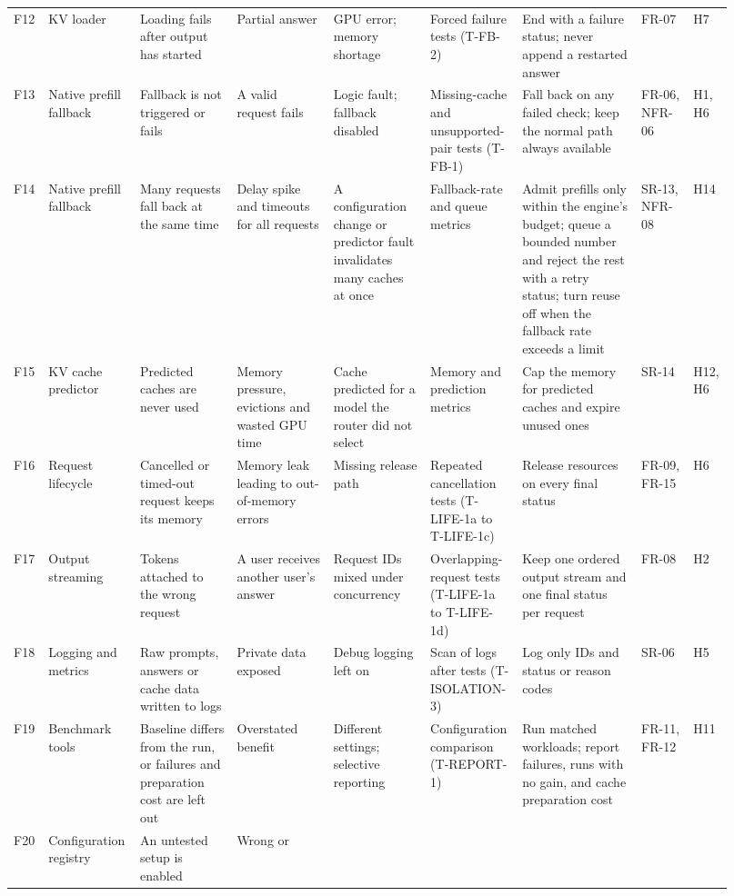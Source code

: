\documentclass{article}
\begin{document}
\begin{landscape}
\begin{longtable}{@{}p{0.04\linewidth}p{0.10\linewidth}p{0.13\linewidth}%
p{0.13\linewidth}p{0.13\linewidth}p{0.11\linewidth}p{0.16\linewidth}%
p{0.07\linewidth}p{0.05\linewidth}@{}}
F12 & KV loader & Loading fails after output has started & Partial answer
& GPU error; memory shortage & Forced failure tests (T-FB-2) & End with a
failure status; never append a restarted answer & FR-07 & H7\\
F13 & Native prefill fallback & Fallback is not triggered or fails & A
valid request fails & Logic fault; fallback disabled & Missing-cache and
unsupported-pair tests (T-FB-1) & Fall back on any failed check; keep the
normal path always available & FR-06, NFR-06 & H1, H6\\
F14 & Native prefill fallback & Many requests fall back at the same time &
Delay spike and timeouts for all requests & A configuration change or
predictor fault invalidates many caches at once & Fallback-rate and queue
metrics & Admit prefills only within the engine's budget; queue a bounded
number and reject the rest with a retry status; turn reuse off when the
fallback rate exceeds a limit & SR-13, NFR-08 & H14\\
F15 & KV cache predictor & Predicted caches are never used & Memory
pressure, evictions and wasted GPU time & Cache predicted for a model the
router did not select & Memory and prediction metrics & Cap the memory for
predicted caches and expire unused ones & SR-14 & H12, H6\\
F16 & Request lifecycle & Cancelled or timed-out request keeps its memory
& Memory leak leading to out-of-memory errors & Missing release path &
Repeated cancellation tests (T-LIFE-1a to T-LIFE-1c) & Release resources on every
final status & FR-09, FR-15 & H6\\
F17 & Output streaming & Tokens attached to the wrong request & A user
receives another user's answer & Request IDs mixed under concurrency &
Overlapping-request tests (T-LIFE-1a to T-LIFE-1d) & Keep one ordered output stream and one
final status per request & FR-08 & H2\\
F18 & Logging and metrics & Raw prompts, answers or cache data written to
logs & Private data exposed & Debug logging left on & Scan of logs after
tests (T-ISOLATION-3) & Log only IDs and status or reason codes & SR-06 & H5\\
F19 & Benchmark tools & Baseline differs from the \progname{} run, or
failures and preparation cost are left out & Overstated benefit & Different
settings; selective reporting & Configuration comparison (T-REPORT-1)
& Run matched workloads; report failures, runs with no gain, and cache
preparation cost & FR-11, FR-12 & H11\\
F20 & Configuration registry & An untested setup is enabled & Wrong or

\end{longtable}
\end{landscape}
\end{document}

